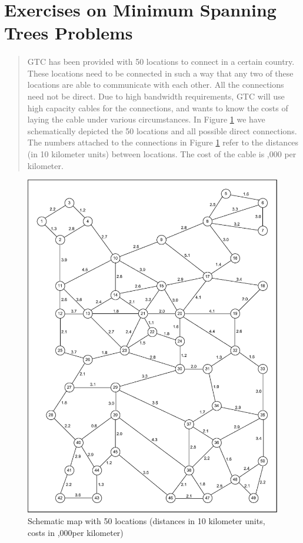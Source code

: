 \section{Exercises on Minimum Spanning Trees Problems}

	\paragraph{}
\begin{quote}
	GTC has been provided with 50 locations to connect in a certain country. These locations need
to be connected in such a way that any two of these locations are able to communicate
with each other. All the connections need not be direct. Due to high bandwidth
requirements, GTC will use high capacity cables for the connections, and wants to
know the costs of laying the cable under various circumstances. In Figure \ref{graph2-1} we
have schematically depicted the 50 locations and all possible direct connections. The
numbers attached to the connections in Figure \ref{graph2-1} refer to the distances (in 10 kilometer
units) between locations. The cost of the cable is ,000 per kilometer.
\end{quote}

\begin{figure}[H]
	\centering
	\includegraphics[scale=0.5]{./img/graph2-1.png}
	\caption{Schematic map with 50 locations (distances in 10 kilometer units, costs in ,000per kilometer)}
	\label{graph2-1}
\end{figure}

